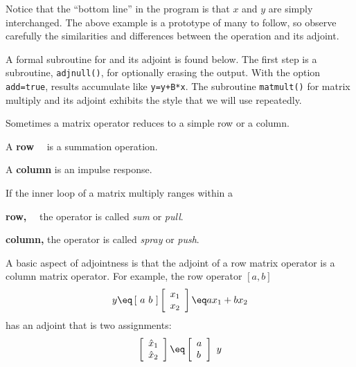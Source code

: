 \noindent
Notice that the ``bottom line'' in the program is that $x$ and $y$
are simply interchanged.
The above example is a prototype of many to follow,
so observe carefully the similarities and differences between the operation
and its adjoint.

\par
A formal subroutine
for  and its adjoint is found below.
The first step is a subroutine, \texttt{adjnull()},
for optionally erasing the output.
With the option {\tt add=true}, results accumulate like {\tt y=y+B*x}.
The subroutine \texttt{matmult()}
for matrix multiply and its adjoint
exhibits the style that we will use repeatedly.

\par
Sometimes a matrix operator reduces to a simple row or a column.

\par\noindent
A {\bf row} \quad\ \ is a summation operation.
\par\noindent
A {\bf column}       is an impulse response.
\vspace{.2in}
\par\noindent
If the inner loop of a matrix multiply ranges within a
\par\noindent
{\bf row,} \quad\ \ the operator is called {\it sum} or {\it pull}.
\par\noindent
{\bf column,}       the operator is called {\it spray} or {\it push}.

\par
A basic aspect of adjointness is that the
adjoint of a row matrix operator is a column matrix operator.
For example,
the row operator $[a,b]$
\begin{equation}
y \eq
\left[ \ a \ b \ \right]
\left[
\begin{array}{l}
	x_1 \\
	x_2
\end{array}
\right]
\eq
a x_1 + b x_2
\end{equation}
has an adjoint that is two assignments:
\begin{equation}
	\left[
	\begin{array}{l}
		\hat x_1 \\
		\hat x_2
	\end{array}
	\right]
	\eq
	\left[
	\begin{array}{l}
		a \\
		b
	\end{array}
	\right]
	\ y
\end{equation}
\par
{}

